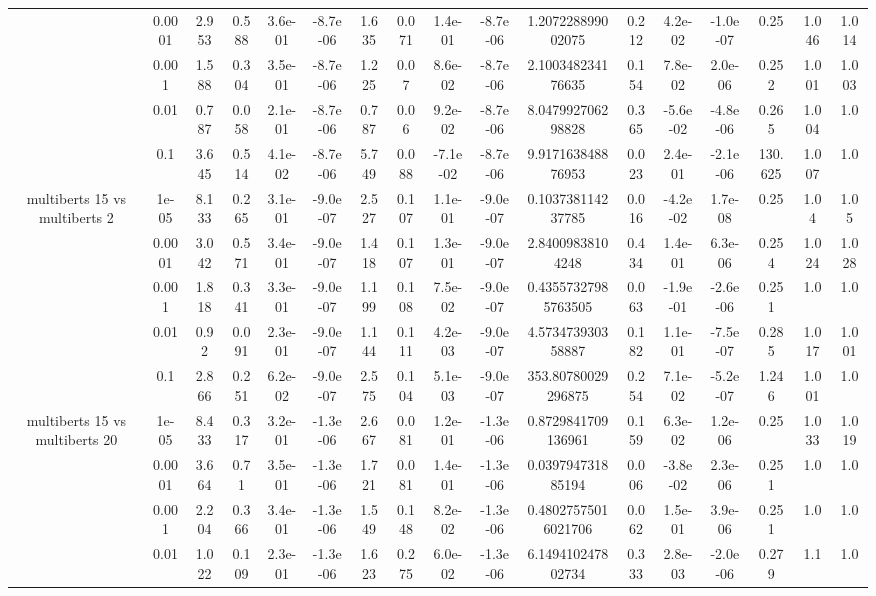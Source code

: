 \begin{tabular}{|c|c|c|c|c|c|c|c|c|c|c|c|c|c|c|c|c|}
 & 0.0001 & 2.953 & 0.588 & 3.6e-01 & -8.7e-06 & 1.635 & 0.071 & 1.4e-01 & -8.7e-06 & 1.207228899002075 & 0.212 & 4.2e-02 & -1.0e-07 & 0.25 & 1.046 & 1.014 \\
 & 0.001 & 1.588 & 0.304 & 3.5e-01 & -8.7e-06 & 1.225 & 0.07 & 8.6e-02 & -8.7e-06 & 2.100348234176635 & 0.154 & 7.8e-02 & 2.0e-06 & 0.252 & 1.001 & 1.003 \\
 & 0.01 & 0.787 & 0.058 & 2.1e-01 & -8.7e-06 & 0.787 & 0.06 & 9.2e-02 & -8.7e-06 & 8.047992706298828 & 0.365 & -5.6e-02 & -4.8e-06 & 0.265 & 1.004 & 1.0 \\
 & 0.1 & 3.645 & 0.514 & 4.1e-02 & -8.7e-06 & 5.749 & 0.088 & -7.1e-02 & -8.7e-06 & 9.917163848876953 & 0.023 & 2.4e-01 & -2.1e-06 & 130.625 & 1.007 & 1.0 \\
\hline
\multirow{5}{*}{multiberts 15 vs multiberts 2} & 1e-05 & 8.133 & 0.265 & 3.1e-01 & -9.0e-07 & 2.527 & 0.107 & 1.1e-01 & -9.0e-07 & 0.103738114237785 & 0.016 & -4.2e-02 & 1.7e-08 & 0.25 & 1.04 & 1.05 \\
 & 0.0001 & 3.042 & 0.571 & 3.4e-01 & -9.0e-07 & 1.418 & 0.107 & 1.3e-01 & -9.0e-07 & 2.84009838104248 & 0.434 & 1.4e-01 & 6.3e-06 & 0.254 & 1.024 & 1.028 \\
 & 0.001 & 1.818 & 0.341 & 3.3e-01 & -9.0e-07 & 1.199 & 0.108 & 7.5e-02 & -9.0e-07 & 0.43557327985763505 & 0.063 & -1.9e-01 & -2.6e-06 & 0.251 & 1.0 & 1.0 \\
 & 0.01 & 0.92 & 0.091 & 2.3e-01 & -9.0e-07 & 1.144 & 0.111 & 4.2e-03 & -9.0e-07 & 4.573473930358887 & 0.182 & 1.1e-01 & -7.5e-07 & 0.285 & 1.017 & 1.001 \\
 & 0.1 & 2.866 & 0.251 & 6.2e-02 & -9.0e-07 & 2.575 & 0.104 & 5.1e-03 & -9.0e-07 & 353.80780029296875 & 0.254 & 7.1e-02 & -5.2e-07 & 1.246 & 1.001 & 1.0 \\
\hline
\multirow{5}{*}{multiberts 15 vs multiberts 20} & 1e-05 & 8.433 & 0.317 & 3.2e-01 & -1.3e-06 & 2.667 & 0.081 & 1.2e-01 & -1.3e-06 & 0.8729841709136961 & 0.159 & 6.3e-02 & 1.2e-06 & 0.25 & 1.033 & 1.019 \\
 & 0.0001 & 3.664 & 0.71 & 3.5e-01 & -1.3e-06 & 1.721 & 0.081 & 1.4e-01 & -1.3e-06 & 0.039794731885194 & 0.006 & -3.8e-02 & 2.3e-06 & 0.251 & 1.0 & 1.0 \\
 & 0.001 & 2.204 & 0.366 & 3.4e-01 & -1.3e-06 & 1.549 & 0.148 & 8.2e-02 & -1.3e-06 & 0.48027575016021706 & 0.062 & 1.5e-01 & 3.9e-06 & 0.251 & 1.0 & 1.0 \\
 & 0.01 & 1.022 & 0.109 & 2.3e-01 & -1.3e-06 & 1.623 & 0.275 & 6.0e-02 & -1.3e-06 & 6.149410247802734 & 0.333 & 2.8e-03 & -2.0e-06 & 0.279 & 1.1 & 1.0 \\

\end{tabular}
